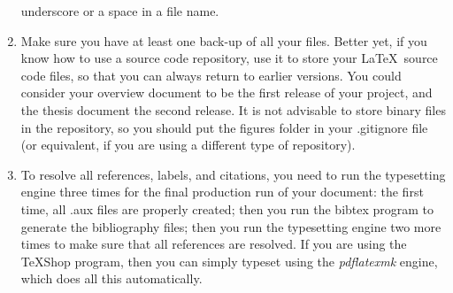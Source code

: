 \documentclass[DIV=calc, paper=letter, fontsize=11pt]{scrartcl}	 %
\begin{document}
\begin{enumerate}
	underscore or a space in a file name.
	\item Make sure you have at least one back-up of all your files.  Better yet, if you know how to use a source code repository, use it to 
	store your \LaTeX\ source code files, so that you can always return to earlier versions.  You could consider your overview document
	to be the first release of your project, and the thesis document the second release.  It is not advisable to store binary files in the 
	repository, so you should put the figures folder in your \textsf{.gitignore} file (or equivalent, if you are using a different type of repository).
	\item To resolve all references, labels, and citations, you need to run the typesetting engine three times for the final production run of 
	your document: the first time, all .aux files are properly created; then you run the bibtex program to generate the bibliography files; then you 
	run the typesetting engine two more times to make sure that all references are resolved.  If you are using the \textsf{TeXShop} program, then
	you can simply typeset using the \textit{pdflatexmk} engine, which does all this automatically.
\end{enumerate}
\end{document}
